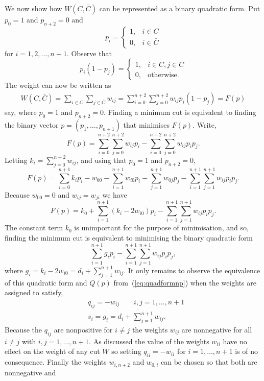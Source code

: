 \documentclass[final,leqno]{siamltex}
\begin{document}
We now show how $W(C,\bar{C})$ can be represented as a binary quadratic form.  Put $p_0 = 1$ and $p_{n+2} = 0$ and
\[
p_i = \begin{cases}
1, & i \in C \\
0, & i \in \bar{C}
\end{cases}
\]
for $i = 1,2,\dots,n+1$.  Observe that
\[
p_i(1 - p_j) = \begin{cases}
1, & i \in C, j \in \bar{C} \\
0, & \text{otherwise}.
\end{cases}
\]
The weight can now be written as
\begin{align*}
W(C,\bar{C}) = \sum_{i \in C} \sum_{j \in \bar{C}} w_{ij} = \sum_{i =0}^{n+2} \sum_{j =0}^{n+2} w_{ij} p_i (1 - p_j) = F(p)
\end{align*}
say, where $p_0 = 1$ and $p_{n+2} = 0$. Finding a minimum cut is equivalent to finding the binary vector $p = (p_1, \dots, p_{n+1})$ that minimises $F(p)$.  Write,
\[
F(p) =  \sum_{i=0}^{n+2} \sum_{j =0}^{n+2} w_{ij}p_i - \sum_{i=0}^{n+2} \sum_{j =0}^{n+2} w_{ij} p_ip_j.
\]
Letting $k_i = \sum_{j =0}^{n+2} w_{ij}$, and using that $p_0 = 1$ and $p_{n+2} = 0$,
\[
F(p) = \sum_{i=0}^{n+1}k_ip_i  - w_{00} - \sum_{i=1}^{n+1} w_{i0} p_i - \sum_{j=1}^{n+1} w_{0j} p_j - \sum_{i=1}^{n+1} \sum_{j =1}^{n+1} w_{ij} p_ip_j.
\]
Because $w_{00} = 0$ and $w_{ij} = w_{ji}$ we have
\[
F(p) = k_0 + \sum_{i=1}^{n+1}( k_i  - 2 w_{i0}) p_i  - \sum_{i=1}^{n+1} \sum_{j =1}^{n+1} w_{ij} p_ip_j.
\]
The constant term $k_0$ is unimportant for the purpose of minimisation, and so, finding the minimum cut is equivalent to minimising the binary quadratic form
\[
\sum_{i=1}^{n+1}g_i p_i  - \sum_{i=1}^{n+1} \sum_{j =1}^{n+1} w_{ij} p_ip_j,
\]
where $g_i = k_i  - 2 w_{i0} = d_i + \sum_{j=1}^{n+1} w_{ij}$.  It only remains to observe the equivalence of this quadratic form and $Q(p)$ from~(\ref{eq:quadformnp}) when the weights are assigned to satisfy,
\begin{align*}
&q_{ij} = - w_{ij} \qquad i,j = 1,\dots,n+1 \\
&s_i = g_i = d_i + \sum_{j=1}^{n+1} w_{ij}.
\end{align*}
Because the $q_{ij}$ are nonpositive for $i \neq j$ the weights $w_{ij}$ are nonnegative for all $i \neq j$ with $i,j = 1,\dots,n+1$.  As discussed the value of the weights $w_{ii}$ have no effect on the weight of any cut $W$ so setting $q_{ii} = - w_{ii}$ for  $i = 1,\dots,n+1$ is of no consequence.  Finally the weights $w_{i,n+2}$ and $w_{0,i}$ can be chosen so that both are nonnegative and 
\end{document}
